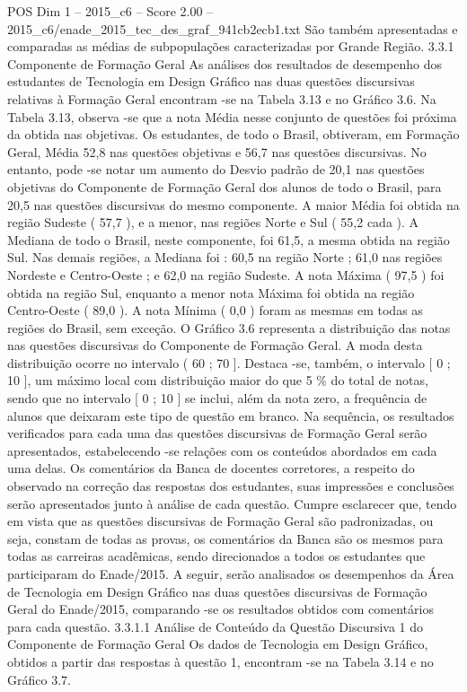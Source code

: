 \begin{textsample}{POS Dim 1 – 2015\_c6 – Score 2.00 – 2015\_c6/enade\_2015\_tec\_des\_graf\_941cb2ecb1.txt}
São também apresentadas e comparadas as médias de subpopulações caracterizadas por Grande Região. 3.3.1 Componente de Formação Geral As análises dos resultados de desempenho dos estudantes de Tecnologia em Design Gráfico nas duas questões discursivas relativas à Formação Geral encontram -se na Tabela 3.13 e no Gráfico 3.6.
Na Tabela 3.13, observa -se que a nota Média nesse conjunto de questões foi próxima da obtida nas objetivas.
Os estudantes, de todo o Brasil, obtiveram, em Formação Geral, Média 52,8 nas questões objetivas e 56,7 nas questões discursivas.
No entanto, pode -se notar um aumento do Desvio padrão de 20,1 nas questões objetivas do Componente de Formação Geral dos alunos de todo o Brasil, para 20,5 nas questões discursivas do mesmo componente.
A maior Média foi obtida na região Sudeste ( 57,7 ), e a menor, nas regiões Norte e Sul ( 55,2 cada ).
A Mediana de todo o Brasil, neste componente, foi 61,5, a mesma obtida na região Sul.
Nas demais regiões, a Mediana foi : 60,5 na região Norte ; 61,0 nas regiões Nordeste e Centro-Oeste ; e 62,0 na região Sudeste.
A nota Máxima ( 97,5 ) foi obtida na região Sul, enquanto a menor nota Máxima foi obtida na região Centro-Oeste ( 89,0 ).
A nota Mínima ( 0,0 ) foram as mesmas em todas as regiões do Brasil, sem exceção.
O Gráfico 3.6 representa a distribuição das notas nas questões discursivas do Componente de Formação Geral.
A moda desta distribuição ocorre no intervalo ( 60 ; 70 ].
Destaca -se, também, o intervalo [ 0 ; 10 ], um máximo local com distribuição maior do que 5 \% do total de notas, sendo que no intervalo [ 0 ; 10 ] se inclui, além da nota zero, a frequência de alunos que deixaram este tipo de questão em branco.
Na sequência, os resultados verificados para cada uma das questões discursivas de Formação Geral serão apresentados, estabelecendo -se relações com os conteúdos abordados em cada uma delas.
Os comentários da Banca de docentes corretores, a respeito do observado na correção das respostas dos estudantes, suas impressões e conclusões serão apresentados junto à análise de cada questão.
Cumpre esclarecer que, tendo em vista que as questões discursivas de Formação Geral são padronizadas, ou seja, constam de todas as provas, os comentários da Banca são os mesmos para todas as carreiras acadêmicas, sendo direcionados a todos os estudantes que participaram do Enade/2015.
A seguir, serão analisados os desempenhos da Área de Tecnologia em Design Gráfico nas duas questões discursivas de Formação Geral do Enade/2015, comparando -se os resultados obtidos com comentários para cada questão. 3.3.1.1 Análise de Conteúdo da Questão Discursiva 1 do Componente de Formação Geral Os dados de Tecnologia em Design Gráfico, obtidos a partir das respostas à questão 1, encontram -se na Tabela 3.14 e no Gráfico 3.7.

\end{textsample}
